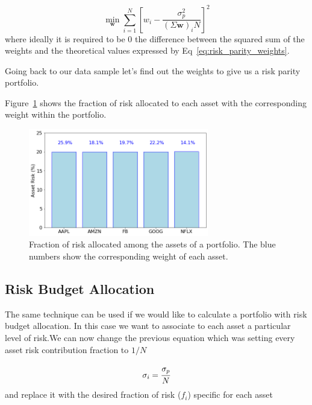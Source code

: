 \begin{equation} 
\underset{\mathbf{w}}{\min } \sum _{i=1}^{N}\left[w_{i}-{\frac {\sigma_p^{2}}{(\Sigma \mathbf{w})_{i}N}}\right]^{2} 
\end{equation}
\noindent
where ideally it is required to be 0 the difference between the squared sum of the weights and the theoretical values expressed by Eq~\ref{eq:risk_parity_weights}.

Going back to our data sample let's find out the weights to give us a risk parity portfolio.


Figure~\ref{fig:risk_parity} shows the fraction of risk allocated to each asset with the corresponding weight within the portfolio.

\begin{figure}[htb]
\centering
\includegraphics[width=0.7\textwidth]{figures/risk_parity}
\caption{Fraction of risk allocated among the assets of a portfolio. The blue numbers show the corresponding weight of each asset.}
\label{fig:risk_parity}
\end{figure}

\subsection{Risk Budget Allocation}
\label{risk-budget-allocation}

The same technique can be used if we would like to calculate a portfolio with risk budget allocation. In this case we want to associate to each asset a particular level of risk.We can now change the previous equation which was setting every asset risk contribution fraction to $1/N$

\begin{equation} 
\sigma _{i}=\cfrac{\sigma_p}{N} 
\end{equation}
and replace it with the desired fraction of risk (\(f_i\)) specific for each asset

